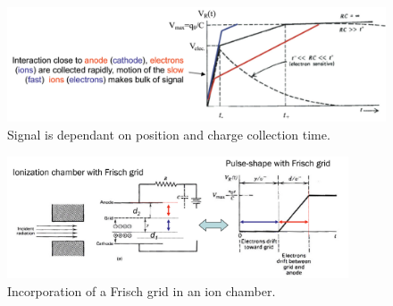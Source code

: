 \begin{figure}[ht]
    \centering
    \includegraphics[width=1.0\textwidth]{images/gas_detector_pulse_Vmax.png}
    \caption{Signal is dependant on position and charge collection time.}
    \label{fig:gas_detector_pulse_Vmax}
\end{figure}
\begin{figure}[ht]
    \centering
    \includegraphics[width=0.9\textwidth]{images/Frisch_grid.png}
    \caption{Incorporation of a Frisch grid in an ion chamber.}
    \label{fig:Frisch_grid}
\end{figure}
